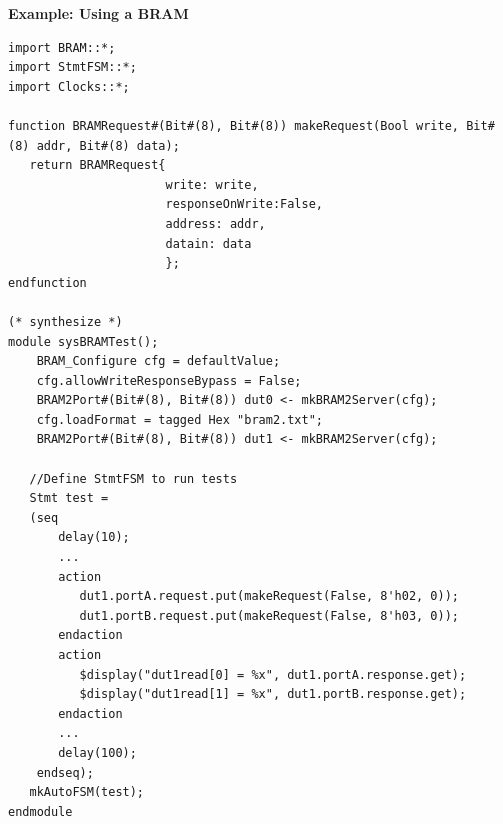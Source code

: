 {\bf Example: Using a BRAM}
\begin{verbatim}
import BRAM::*;
import StmtFSM::*;
import Clocks::*;

function BRAMRequest#(Bit#(8), Bit#(8)) makeRequest(Bool write, Bit#(8) addr, Bit#(8) data);
   return BRAMRequest{
                      write: write,
                      responseOnWrite:False,
                      address: addr,
                      datain: data
                      };
endfunction

(* synthesize *)
module sysBRAMTest();
    BRAM_Configure cfg = defaultValue;
    cfg.allowWriteResponseBypass = False;
    BRAM2Port#(Bit#(8), Bit#(8)) dut0 <- mkBRAM2Server(cfg);
    cfg.loadFormat = tagged Hex "bram2.txt";
    BRAM2Port#(Bit#(8), Bit#(8)) dut1 <- mkBRAM2Server(cfg);

   //Define StmtFSM to run tests
   Stmt test =
   (seq
       delay(10);
       ...
       action
          dut1.portA.request.put(makeRequest(False, 8'h02, 0));
          dut1.portB.request.put(makeRequest(False, 8'h03, 0));
       endaction
       action 
          $display("dut1read[0] = %x", dut1.portA.response.get);
          $display("dut1read[1] = %x", dut1.portB.response.get);
       endaction
       ...
       delay(100);
    endseq);
   mkAutoFSM(test);
endmodule
\end{verbatim}
